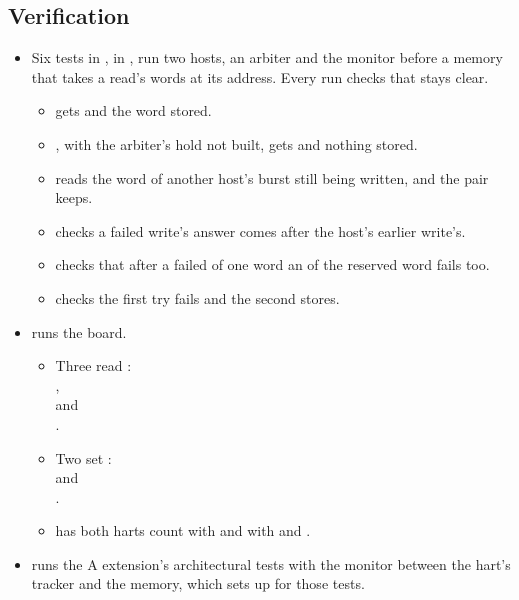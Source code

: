 \subsection*{Verification}

\begin{itemize}
\item Six tests in , in ,
run two hosts, an arbiter and the monitor before a memory that takes a
read's words at its address. Every run checks that  stays
clear.
\begin{itemize}
\item {} gets 
and the word stored.
\item {}, with the arbiter's
hold not built, gets  and nothing stored.
\item {} reads
the word of another host's burst still being written, and the pair
keeps.
\item {} checks a
failed write's answer comes after the host's earlier write's.
\item {}
checks that after a failed  of one word an  of the
reserved word fails too.
\item {} checks the
first try fails and the second stores.
\end{itemize}
\item {} runs the board.
\begin{itemize}
\item Three read :\\
,\\
 and\\
.
\item Two set :\\
 and\\
.
\item {} has both harts count with
 and with  and .
\end{itemize}
\item {} runs the A
extension's architectural tests with the monitor between the hart's
tracker and the memory, which  sets up for those
tests.
\end{itemize}

